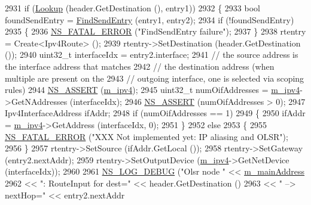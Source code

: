 \begin{DoxyCode}
2931   \textcolor{keywordflow}{if} (\hyperlink{classns3_1_1olsr_1_1RoutingProtocol_a514bf401454b233af509476fc3fd5d6b}{Lookup} (header.GetDestination (), entry1))
2932     \{
2933       \textcolor{keywordtype}{bool} foundSendEntry = \hyperlink{classns3_1_1olsr_1_1RoutingProtocol_a15394858cdfb821d54f8661ed712083c}{FindSendEntry} (entry1, entry2);
2934       \textcolor{keywordflow}{if} (!foundSendEntry)
2935         \{
2936           \hyperlink{group__fatal_ga5131d5e3f75d7d4cbfd706ac456fdc85}{NS\_FATAL\_ERROR} (\textcolor{stringliteral}{"FindSendEntry failure"});
2937         \}
2938       rtentry = Create<Ipv4Route> ();
2939       rtentry->SetDestination (header.GetDestination ());
2940       uint32\_t interfaceIdx = entry2.interface;
2941       \textcolor{comment}{// the source address is the interface address that matches}
2942       \textcolor{comment}{// the destination address (when multiple are present on the}
2943       \textcolor{comment}{// outgoing interface, one is selected via scoping rules)}
2944       \hyperlink{assert_8h_a6dccdb0de9b252f60088ce281c49d052}{NS\_ASSERT} (\hyperlink{classns3_1_1olsr_1_1RoutingProtocol_afede79b25ec57e797ff900ae01bca1df}{m\_ipv4});
2945       uint32\_t numOifAddresses = \hyperlink{classns3_1_1olsr_1_1RoutingProtocol_afede79b25ec57e797ff900ae01bca1df}{m\_ipv4}->GetNAddresses (interfaceIdx);
2946       \hyperlink{assert_8h_a6dccdb0de9b252f60088ce281c49d052}{NS\_ASSERT} (numOifAddresses > 0);
2947       Ipv4InterfaceAddress ifAddr;
2948       \textcolor{keywordflow}{if} (numOifAddresses == 1)
2949         \{
2950           ifAddr = \hyperlink{classns3_1_1olsr_1_1RoutingProtocol_afede79b25ec57e797ff900ae01bca1df}{m\_ipv4}->GetAddress (interfaceIdx, 0);
2951         \}
2952       \textcolor{keywordflow}{else}
2953         \{
2955           \hyperlink{group__fatal_ga5131d5e3f75d7d4cbfd706ac456fdc85}{NS\_FATAL\_ERROR} (\textcolor{stringliteral}{"XXX Not implemented yet:  IP aliasing and OLSR"});
2956         \}
2957       rtentry->SetSource (ifAddr.GetLocal ());
2958       rtentry->SetGateway (entry2.nextAddr);
2959       rtentry->SetOutputDevice (\hyperlink{classns3_1_1olsr_1_1RoutingProtocol_afede79b25ec57e797ff900ae01bca1df}{m\_ipv4}->GetNetDevice (interfaceIdx));
2960 
2961       \hyperlink{group__logging_ga413f1886406d49f59a6a0a89b77b4d0a}{NS\_LOG\_DEBUG} (\textcolor{stringliteral}{"Olsr node "} << \hyperlink{classns3_1_1olsr_1_1RoutingProtocol_a58cc50ed5d1039aab603e90e318aabfb}{m\_mainAddress}
2962                                  << \textcolor{stringliteral}{": RouteInput for dest="} << header.GetDestination ()
2963                                  << \textcolor{stringliteral}{" --> nextHop="} << entry2.nextAddr

\end{DoxyCode}
